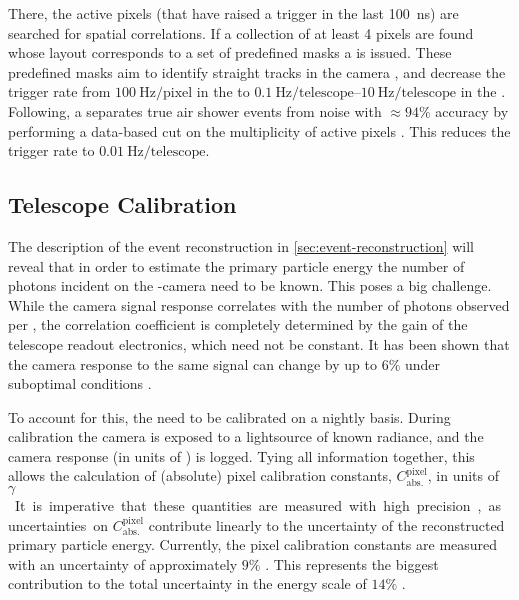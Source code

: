 There, the active pixels (that have raised a trigger in the last 
\SI{100}{\nano\second}) are searched for spatial correlations. If a collection 
of at least 4 pixels are found whose layout corresponds to a set of predefined
masks a \SLT is issued. These predefined masks aim to identify straight tracks 
in the camera \FOV, and decrease the trigger rate from 
$\SI{100}{\hertz\per\mathrm{pixel}}$ in the \FLT to 
$\SIrange[range-units = single]{0.1}{10}{\hertz\per\mathrm{telescope}}$ in the 
\SLT. Following, a \TLT separates true air shower events from noise with 
$\approx94\%$ accuracy by performing a data-based cut on the multiplicity of 
active pixels \cite{abrahamFluorescenceDetectorPierre2010}. This reduces the 
trigger rate to $\SI{0.01}{\hertz\per\mathrm{telescope}}$. 

\subsection{Telescope Calibration}
\label{ssec:fd-calibration}

The description of the event reconstruction in \cref{sec:event-reconstruction}
will reveal that in order to estimate the primary particle energy the number of
photons incident on the \FD-camera need to be known. This poses a big 
challenge. While the camera signal response correlates with the number of 
photons observed per \EAS, the correlation coefficient is completely determined
by the gain of the telescope readout electronics, which need not be constant. 
It has been shown that the camera response to the same signal can change by up 
to $6\%$ under suboptimal conditions \cite{filipJumpsXYCalibration2024}.

To account for this, the \PMTs need to be calibrated on a nightly basis. During
calibration the camera is exposed to a lightsource of known radiance, and the 
camera response (in units of \ADC) is logged. Tying all information together, 
this allows the calculation of (absolute) pixel calibration constants, 
$C^\mathrm{pixel}_\mathrm{abs.}$, in units of \SI{}{$\gamma$\per\ADC}. It is
imperative that these quantities are measured with high precision, as
uncertainties on $C^\mathrm{pixel}_\mathrm{abs.}$ contribute linearly to the 
uncertainty of the reconstructed primary particle energy. Currently, the pixel
calibration constants are measured with an uncertainty of approximately $9\%$
\cite{dawsonUpdateAugerEnergy13}. This represents the biggest contribution to 
the total uncertainty in the \PAO energy scale of $14\%$ 
\cite{verziEnergyScalePierre2013}.


